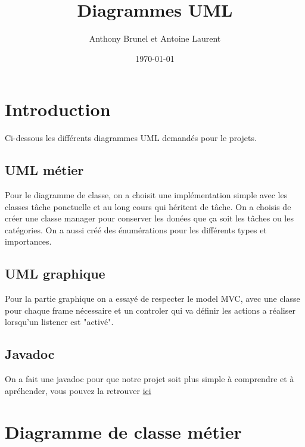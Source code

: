 \documentclass{article}
\title{Diagrammes UML}
\author{Anthony Brunel et Antoine Laurent}
\date{\today}
\begin{document}
\maketitle
\newpage
\tableofcontents
\listoffigures
\newpage

\section{Introduction}

Ci-dessous les différents diagrammes UML demandés pour le projets.

\subsection{UML métier}

Pour le diagramme de classe, on a choisit une implémentation simple avec les classes tâche ponctuelle et au long cours qui héritent de tâche. 
On a choisis de créer une classe manager pour conserver les donées que ça soit les tâches ou les catégories.
On a aussi créé des énumérations pour les différents types et importances.

\subsection{UML graphique}
Pour la partie graphique on a essayé de respecter le model MVC, avec une classe pour chaque frame nécessaire et un controler qui va définir les actions a réaliser lorsqu'un listener est "activé".

\subsection{Javadoc}

On a fait une javadoc pour que notre projet soit plus simple à comprendre et à apréhender, vous pouvez la retrouver \href{run:../doc/index.html}{ici}

\clearpage
\section{Diagramme de classe métier}
\end{document}
